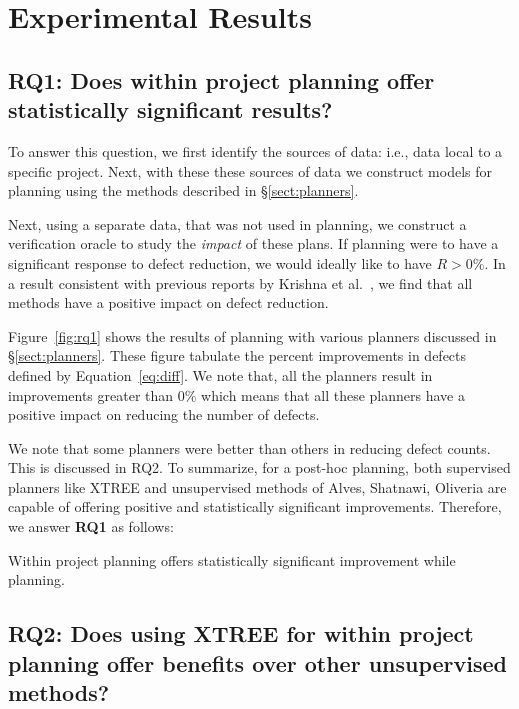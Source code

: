 \documentclass[10pt,journal,compsoc]{IEEEtran}
\newcommand{\tion}[1]{\S\ref{sect:#1}}
\newcommand{\fig}[1]{Figure~\ref{fig:#1}}
\newcommand{\eq}[1]{Equation~\ref{eq:#1}}
\begin{document}
\section{Experimental Results}
\label{sect:results}

\subsection*{{\bf RQ1: Does within project planning offer statistically significant results?}}

To answer this question, we first identify the sources of data: i.e., data local to a specific project. Next, with these these sources of data we construct models for planning using the methods described in \tion{planners}. 

Next, using a separate data, that was not used in planning, we construct a verification oracle to study the \textit{impact} of these plans.  If planning were to have a significant response to defect reduction, we would ideally like to have $R>0\%$. In a result consistent with previous reports by Krishna et al.~\cite{krishna17a}, we find that all methods have a positive impact on defect reduction.

\fig{rq1} shows the results of planning with various planners discussed in \tion{planners}. These figure tabulate the percent improvements in defects defined by \eq{diff}. We note that, all the planners result in improvements greater than 0\% which means that all these planners have a positive impact on reducing the number of defects.

We note that some planners were better than others in reducing defect counts. This is discussed in RQ2. To summarize, for a post-hoc planning, both supervised planners like XTREE and unsupervised methods of Alves, Shatnawi, Oliveria are capable of offering positive and statistically significant improvements. Therefore, we answer \textbf{RQ1} as follows:

\begin{lesson}
	Within project planning offers statistically significant improvement while planning.\\[-.2cm]
\end{lesson}

\subsection*{{\bf RQ2: Does using XTREE for within project planning offer benefits over other unsupervised methods?}}
\end{document}
